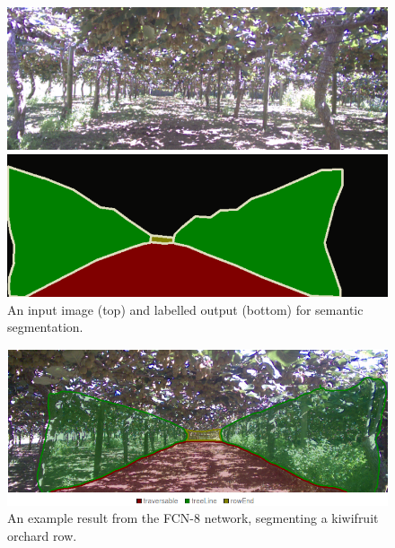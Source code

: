 \documentclass[preprint,authoryear,12pt]{elsarticle}
\begin{document}
        \begin{figure}[htb]
            \centering
            \includegraphics[width=\linewidth]{imgs/photos/segImgLabelPair_trimmed.png}
            \caption{
                An input image (top) and labelled output (bottom) for semantic segmentation.
            }
            \label{fig:segImgLabelPair}
        \end{figure}

        \begin{figure}[htb]
            \centering
            \includegraphics[width=\linewidth]{imgs/photos/semSegRowResults.png}
            \caption{
                An example result from the FCN-8 network, segmenting a kiwifruit orchard row.
            }
            \label{fig:semSegRowResults}
        \end{figure}
\end{document}
